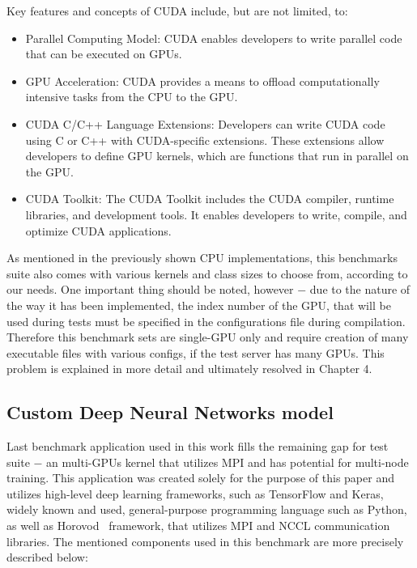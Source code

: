 Key features and concepts of CUDA include, but are not limited, to:
\begin{itemize}
    \item Parallel Computing Model: CUDA enables developers to write parallel
    code that can be executed on GPUs.
    \item GPU Acceleration: CUDA provides a means to offload computationally
    intensive tasks from the CPU to the GPU\@.
    \item CUDA C/C++ Language Extensions: Developers can write CUDA code using
    C or C++ with CUDA-specific extensions. These extensions allow developers
    to define GPU kernels, which are functions that run in parallel on the GPU\@.
    \item CUDA Toolkit: The CUDA Toolkit includes the CUDA compiler, runtime
    libraries, and development tools. It enables developers to write, compile,
    and optimize CUDA applications.
\end{itemize}

As mentioned in the previously shown CPU implementations, this benchmarks
suite also comes with various kernels and class sizes to choose from, according
to our needs. One important thing should be noted, however $-$ due to the
nature of the way it has been implemented, the index number of the GPU, that
will be used during tests must be specified in the configurations file during
compilation. Therefore this benchmark sets are single-GPU only and require
creation of many executable files with various configs, if the test server
has many GPUs. This problem is explained in more detail and ultimately
resolved in Chapter 4.

\newpage

\subsection{Custom Deep Neural Networks model}

Last benchmark application used in this work fills the remaining gap for test
suite $-$ an multi-GPUs kernel that utilizes MPI and has potential for
multi-node training. This application was created solely for the purpose of
this paper and utilizes high-level deep learning frameworks, such as
TensorFlow and Keras, widely known and used, general-purpose programming
language such as Python, as well as Horovod~\cite{Horovod_IDRIS} framework,
that utilizes MPI and NCCL communication libraries. The mentioned components
used in this benchmark are more precisely described below:

